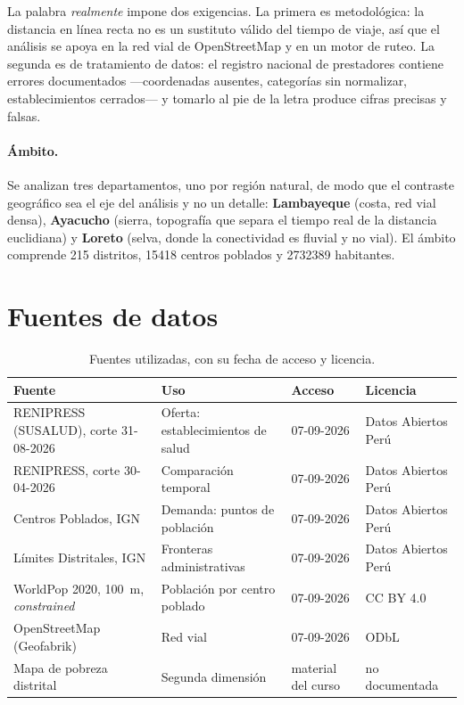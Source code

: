 \documentclass[11pt,a4paper]{article}
\begin{document}
La palabra \emph{realmente} impone dos exigencias. La primera es metodológica: la distancia
en línea recta no es un sustituto válido del tiempo de viaje, así que el análisis se apoya en
la red vial de OpenStreetMap y en un motor de ruteo. La segunda es de tratamiento de datos:
el registro nacional de prestadores contiene errores documentados —coordenadas ausentes,
categorías sin normalizar, establecimientos cerrados— y tomarlo al pie de la letra produce
cifras precisas y falsas.

\paragraph{Ámbito.} Se analizan tres departamentos, uno por región natural, de modo que el
contraste geográfico sea el eje del análisis y no un detalle: \textbf{Lambayeque} (costa, red
vial densa), \textbf{Ayacucho} (sierra, topografía que separa el tiempo real de la distancia
euclidiana) y \textbf{Loreto} (selva, donde la conectividad es fluvial y no vial). El ámbito
comprende \num{215} distritos, \num{15418} centros poblados y \num{2732389} habitantes.

\section{Fuentes de datos}

\begin{table}[H]
\centering
\caption{Fuentes utilizadas, con su fecha de acceso y licencia.}
\label{tab:fuentes}
\small
\begin{tabular}{p{4.4cm}p{3.5cm}p{2.2cm}p{3.4cm}}
\toprule
\textbf{Fuente} & \textbf{Uso} & \textbf{Acceso} & \textbf{Licencia} \\
\midrule
RENIPRESS (SUSALUD), corte 31-08-2026 & Oferta: establecimientos de salud &
07-09-2026 & Datos Abiertos Perú \\
RENIPRESS, corte 30-04-2026 & Comparación temporal & 07-09-2026 & Datos Abiertos Perú \\
Centros Poblados, IGN & Demanda: puntos de población & 07-09-2026 & Datos Abiertos Perú \\
Límites Distritales, IGN & Fronteras administrativas & 07-09-2026 & Datos Abiertos Perú \\
WorldPop 2020, \SI{100}{\meter}, \emph{constrained} & Población por centro poblado &
07-09-2026 & CC BY 4.0 \\
OpenStreetMap (Geofabrik) & Red vial & 07-09-2026 & ODbL \\
Mapa de pobreza distrital & Segunda dimensión & material del curso & no documentada \\
\bottomrule
\end{tabular}
\end{table}
\end{document}
